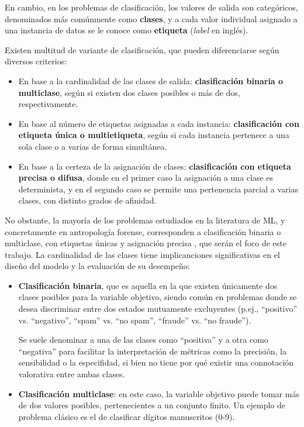 En cambio, en los problemas de clasificación, los valores de salida son categóricos, denominados más 
comúnmente como \textbf{clases}, y a cada valor individual asignado a una instancia de datos se le conoce como 
\textbf{etiqueta} (\textit{label} en inglés).

Existen multitud de variante de clasificación, que pueden diferenciarse según diversos criterios:

\begin{itemize}
    \item En base a la cardinalidad de las clases de salida: \textbf{clasificación binaria o multiclase}, 
    según si existen dos clases posibles o más de dos, respectivamente.

    \item En base al número de etiquetas asignadas a cada instancia: \textbf{clasificación con etiqueta única 
    o multietiqueta}, según si cada instancia pertenece a una sola clase o a varias de forma simultánea.

    \item En base a la certeza de la asignación de clases: \textbf{clasificación con etiqueta precisa o 
    difusa}, donde en el primer caso la asignación a una clase es determinista, y en el segundo caso se 
    permite una pertenencia parcial a varias clases, con distinto grados de afinidad.
    
\end{itemize}

No obstante, la mayoría de los problemas estudiados en la literatura de ML, y concretamente en antropología 
forense, corresponden a clasificación binaria o multiclase, con etiquetas únicas y asignación precisa 
\cite{bishop2006}, que serán el foco de este trabajo. La cardinalidad de las clases tiene implicanciones 
significativas en el diseño del modelo y la evaluación de su desempeño:

\begin{itemize}

    \item \textbf{Clasificación binaria}, que es aquella en la que existen únicamente dos clases posibles para 
    la variable objetivo, siendo común en problemas donde se desea discriminar entre dos estados mutuamente 
    excluyentes (p.ej., ``positivo'' vs. ``negativo'', ``spam'' vs. ``no spam'', ``fraude'' vs. ``no 
    fraude'').
    
    Se suele denominar a una de las clases como ``positiva'' y a otra como ``negativa'' para facilitar la 
    interpretación de métricas como la precisión, la sensibilidad o la especifidad, si bien no tiene por qué 
    existir una connotación valorativa entre ambas clases.
    
    \item \textbf{Clasificación multiclase}: en este caso, la variable objetivo puede tomar más de dos valores 
    posibles, pertenecientes a un conjunto finito. Un ejemplo de problema clásico es el de clasificar dígitos
    manuscritos (0-9).

\end{itemize}

